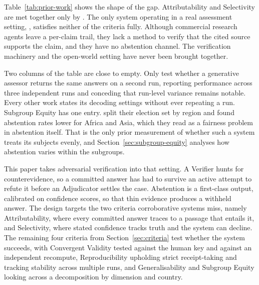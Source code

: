 Table~\ref{tab:prior-work} shows the shape of the gap. Attributability and Selectivity are met together only by \citet{chowdhury2026}. The only system operating in a real assessment setting, \citet{fumega2026}, satisfies neither of the criteria fully. Although commercial research agents leave a per-claim trail, they lack a method to verify that the cited source supports the claim, and they have no abstention channel. The verification machinery and the open-world setting have never been brought together.

Two columns of the table are close to empty. Only \citet{chowdhury2026} test whether a generative assessor returns the same answers on a second run, reporting performance across three independent runs and conceding that run-level variance remains notable. Every other work states its decoding settings without ever repeating a run. Subgroup Equity has one entry. \citet{feng2024} split their election set by region and found abstention rates lower for Africa and Asia, which they read as a fairness problem in abstention itself. That is the only prior measurement of whether such a system treats its subjects evenly, and Section~\ref{sec:subgroup-equity} analyses how abstention varies within the subgroups.

This paper takes adversarial verification into that setting. A Verifier hunts for counterevidence, so a committed answer has had to survive an active attempt to refute it before an Adjudicator settles the case. Abstention is a first-class output, calibrated on confidence scores, so that thin evidence produces a withheld answer. The design targets the two criteria corroborative systems miss, namely Attributability, where every committed answer traces to a passage that entails it, and Selectivity, where stated confidence tracks truth and the system can decline. The remaining four criteria from Section~\ref{sec:criteria} test whether the system succeeds, with Convergent Validity tested against the human key and against an independent recompute, Reproducibility upholding strict receipt-taking and tracking stability across multiple runs, and Generalisability and Subgroup Equity looking across a decomposition by dimension and country.
